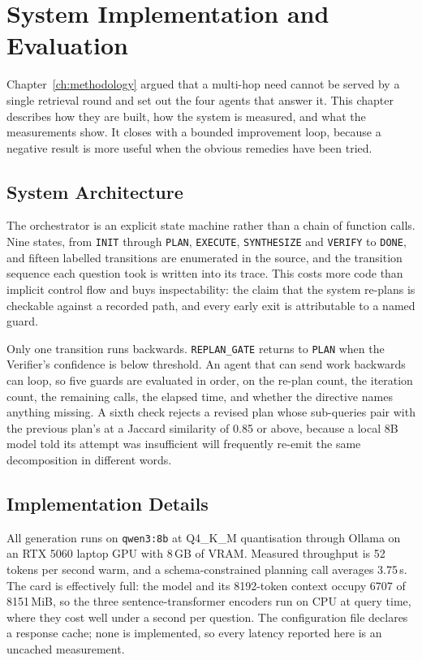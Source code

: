 \chapter{System Implementation and Evaluation}
\label{ch:implementation}

Chapter~\ref{ch:methodology} argued that a multi-hop need cannot be served by a
single retrieval round and set out the four agents that answer it. This chapter
describes how they are built, how the system is measured, and what the
measurements show. It closes with a bounded improvement loop, because a
negative result is more useful when the obvious remedies have been tried.

\section{System Architecture}
\label{sec:architecture}

The orchestrator is an explicit state machine rather than a chain of function
calls. Nine states, from \texttt{INIT} through \texttt{PLAN},
\texttt{EXECUTE}, \texttt{SYNTHESIZE} and \texttt{VERIFY} to \texttt{DONE},
and fifteen labelled transitions are enumerated in the source, and the
transition sequence each question took is written into its trace. This costs
more code than implicit control flow and buys inspectability: the claim that
the system re-plans is checkable against a recorded path, and every early exit
is attributable to a named guard.

Only one transition runs backwards. \texttt{REPLAN\_GATE} returns to
\texttt{PLAN} when the Verifier's confidence is below threshold. An agent that
can send work backwards can loop, so five guards are evaluated in order, on
the re-plan count, the iteration count, the remaining calls, the elapsed
time, and whether the directive names anything missing. A sixth check rejects
a revised plan whose sub-queries pair with the previous plan's at a Jaccard
similarity of 0.85 or above, because a local 8B model told its attempt was
insufficient will frequently re-emit the same decomposition in different
words.

\section{Implementation Details}
\label{sec:inference}

All generation runs on \texttt{qwen3:8b} at Q4\_K\_M quantisation through
Ollama on an RTX 5060 laptop GPU with 8\,GB of VRAM. Measured throughput is 52
tokens per second warm, and a schema-constrained planning call averages
3.75\,s. The card is effectively full: the model and its 8192-token context
occupy 6707 of 8151\,MiB, so the three sentence-transformer encoders run on
CPU at query time, where they cost well under a second per question. The
configuration file declares a response cache; none is implemented, so every
latency reported here is an uncached measurement.

